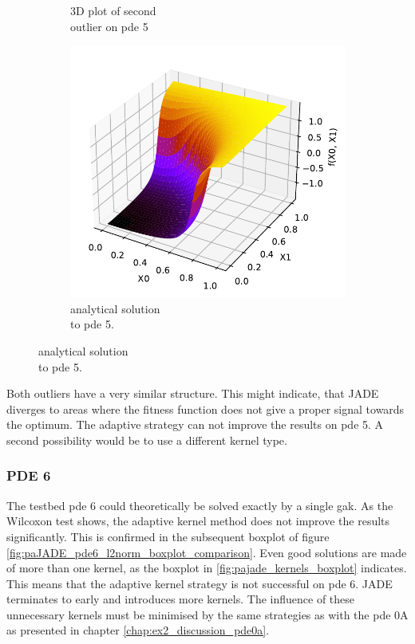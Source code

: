 \documentclass[./\jobname.tex]{subfiles}
\begin{document}
\begin{figure}[H]
\begin{subfigure}[b]{0.3333\linewidth}
		\caption{3D plot of second \\outlier on \gls{pde} 5}
		\label{fig:paJADE_pde5_outlier1}
	\end{subfigure}%
	\begin{subfigure}[b]{0.3333\linewidth}
		\centering
		\includegraphics[width=1\textwidth]{../../code/testbed/pde5/sol_pde_5.pdf}
		\caption{analytical solution \\to \gls{pde} 5.}
		\label{fig:pde5_analytical_solution_2}
	\end{subfigure}%
	\label{fig:paJADE_pde5_3D_plot_outlier}
\end{figure}

Both outliers have a very similar structure. This might indicate, that JADE diverges to areas where the fitness function does not give a proper signal towards the optimum. The adaptive strategy can not improve the results on \gls{pde} 5. A second possibility would be to use a different kernel type. 


\subsubsection{PDE 6}

The testbed \gls{pde} 6 could theoretically be solved exactly by a single \gls{gak}. As the Wilcoxon test shows, the adaptive kernel method does not improve the results significantly. This is confirmed in the subsequent boxplot of figure \ref{fig:paJADE_pde6_l2norm_boxplot_comparison}. Even good solutions are made of more than one kernel, as the boxplot in \ref{fig:pajade_kernels_boxplot} indicates. This means that the adaptive kernel strategy is not successful on \gls{pde} 6. JADE terminates to early and introduces more kernels. The influence of these unnecessary kernels must be minimised by the same strategies as with the \gls{pde} 0A as presented in chapter \ref{chap:ex2_discussion_pde0a}.
\end{document}
